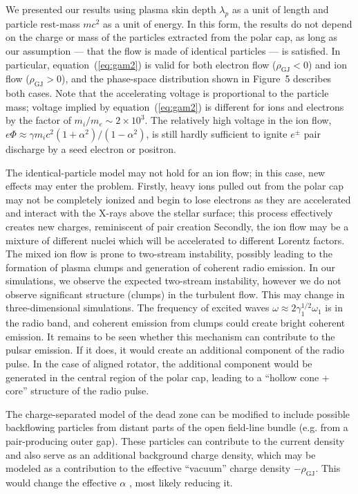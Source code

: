 We presented our results using plasma skin depth $\lambda_p$ as a unit of
length and particle rest-mass $mc^2$ as a unit of energy. In this form, the results
do not depend on the charge or mass of the particles extracted from the polar cap,
as long as our assumption --- that the flow is made of identical particles --- is
satisfied. In particular, equation~(\ref{eq:gam2}) is valid for both electron flow
($\rho_\mathrm{GJ}<0$) and ion flow ($\rho_\mathrm{GJ}>0$), and the phase-space
distribution shown in Figure~5 describes both cases.
Note that the accelerating voltage is proportional to the particle mass;
voltage implied by equation~(\ref{eq:gam2}) is different for ions and electrons by
the factor of $m_i/m_e\sim 2\times 10^3$.
The relatively high voltage in the ion flow,
$e\Phi\approx\gamma m_ic^2 (1+\alpha^2)/(1-\alpha^2)$,
is still hardly sufficient to ignite $e^\pm$ pair discharge by a seed electron or positron.

The identical-particle model may not hold for an ion flow; in this case,
new effects may enter the problem.
Firstly, heavy ions pulled out from the polar cap may not be completely ionized
and begin to lose electrons as they are accelerated and interact with the X-rays
above the stellar surface; this process effectively creates new charges,
reminiscent of pair creation
\citep[e.g.][]{jones_post-glitch_2002}
Secondly, the ion flow may be a
mixture of different nuclei which will be accelerated to different Lorentz factors.
The mixed ion flow is prone to two-stream instability, possibly leading to the formation
of plasma clumps and generation of coherent radio emission.
In our simulations, we observe the expected two-stream instability,
however we do not observe significant structure (clumps) in the turbulent flow.
This may change in three-dimensional simulations.
The frequency of excited waves $\omega\approx 2\gamma_1^{1/2}\omega_1$
is in the radio band, and coherent emission from clumps could create bright
coherent emission. It remains to be seen whether this mechanism
can contribute to the pulsar emission. If it does,
it would create an additional component of the radio pulse.
In the case of aligned rotator, the additional component would be generated in
the central region of the polar cap, leading to a ``hollow cone + core'' structure of
the radio pulse.

The charge-separated model of the dead zone can be modified to include possible
backflowing particles from distant parts of the open field-line bundle
(e.g. from a pair-producing outer gap). These particles can contribute to the current
density and also serve as an
additional background charge density, which may be modeled as a contribution to the
effective ``vacuum'' charge density  $-\rho_\mathrm{GJ}$.
This would change the effective $\alpha$
\citep[][B08]{lyubarskij_current_1992},
most likely reducing it.

